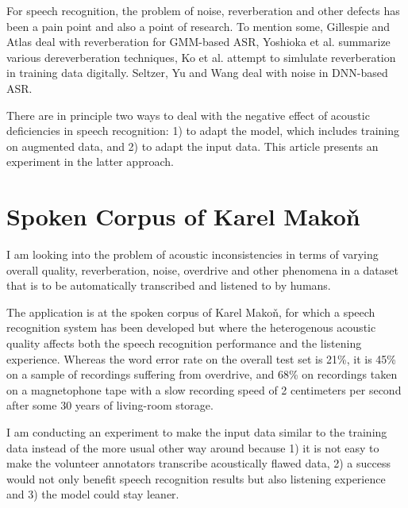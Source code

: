 \documentclass[runningheads,a4paper]{llncs}
\begin{document}
For speech recognition, the problem of noise, reverberation and other defects
has been a pain point and also a point of research. To mention some, Gillespie
and Atlas\cite{gillespie2002diversity} deal with reverberation for
GMM-based ASR, Yoshioka et al.\cite{reverbmagazine} summarize various
dereverberation techniques, Ko et al.\cite{reverbaugment} attempt to
simlulate reverberation in training data digitally. Seltzer, Yu and
Wang\cite{dnnnoiserobust} deal with noise in DNN-based ASR.

There are in principle two ways to deal with the negative effect of acoustic
deficiencies in speech recognition: 1) to adapt the model, which includes
training on augmented data, and 2) to adapt the input data. This article
presents an experiment in the latter approach.

\section{Spoken Corpus of Karel Makoň}

I am looking into the problem of acoustic inconsistencies in terms of varying
overall quality, reverberation, noise, overdrive and other phenomena in a
dataset that is to be automatically transcribed and listened to by humans.

The application is at the spoken corpus of Karel Makoň\cite{makondata}, for which
a speech recognition system has been developed\cite{kruuza2012making} but where
the heterogenous acoustic quality affects both the speech recognition
performance and the listening experience. Whereas the word error rate on the
overall test set is 21\%, it is 45\% on a sample of recordings suffering from
overdrive, and 68\% on recordings taken on a magnetophone tape with a slow
recording speed of 2 centimeters per second after some 30 years of living-room
storage.

I am conducting an experiment to make the input data similar to the training
data instead of the more usual other way around because 1) it is not easy to
make the volunteer annotators transcribe acoustically flawed data, 2) a
success would not only benefit speech recognition results but also listening
experience and 3) the model could stay leaner.
\end{document}
